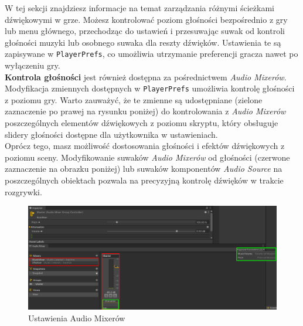 W tej sekcji znajdziesz informacje na temat zarządzania różnymi ścieżkami dźwiękowymi w grze. Możesz kontrolować poziom głośności bezpośrednio z gry lub menu głównego, przechodząc do ustawień i przesuwając suwak od kontroli głośności muzyki lub osobnego suwaka dla reszty dźwięków. Ustawienia te są zapisywane w \texttt{PlayerPrefs}, co umożliwia utrzymanie preferencji gracza nawet po wyłączeniu gry. \\

\textbf{Kontrola głośności} jest również dostępna za pośrednictwem \textit{Audio Mixerów}. Modyfikacja zmiennych dostępnych w \texttt{PlayerPrefs} umożliwia kontrolę głośności z poziomu gry. Warto zauważyć, że te zmienne są udostępniane (zielone zaznaczenie po prawej na rysunku poniżej) do kontrolowania z \textit{Audio Mixerów} poszczególnych elementów dźwiękowych z poziomu skryptu, który obsługuje slidery głośności dostępne dla użytkownika w ustawieniach. \\

Oprócz tego, masz możliwość dostosowania głośności i efektów dźwiękowych z poziomu sceny. Modyfikowanie suwaków \textit{Audio Mixerów} od głośności (czerwone zaznaczenie na obrazku poniżej) lub suwaków komponentów \textit{Audio Source} na poszczególnych obiektach pozwala na precyzyjną kontrolę dźwięków w trakcie rozgrywki.

\begin{figure}[h]
    \centering
    \includegraphics[width=1\linewidth]{Images/audioMixersSet.png}
    \caption{Ustawienia Audio Mixerów}
\end{figure}